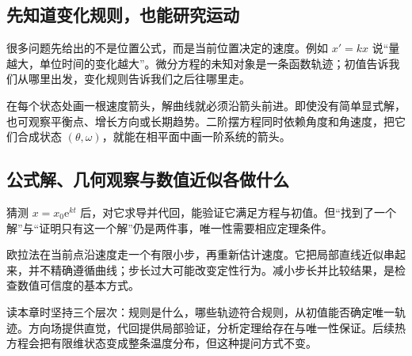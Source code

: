 \subsection*{先知道变化规则，也能研究运动}
很多问题先给出的不是位置公式，而是当前位置决定的速度。例如 $x'=kx$ 说“量越大，单位时间的变化越大”。微分方程的未知对象是一条函数轨迹；初值告诉我们从哪里出发，变化规则告诉我们之后往哪里走。

在每个状态处画一根速度箭头，解曲线就必须沿箭头前进。即使没有简单显式解，也可观察平衡点、增长方向或长期趋势。二阶摆方程同时依赖角度和角速度，把它们合成状态 $(\theta,\omega)$，就能在相平面中画一阶系统的箭头。

\subsection*{公式解、几何观察与数值近似各做什么}
猜测 $x=x_0\mathrm e^{kt}$ 后，对它求导并代回，能验证它满足方程与初值。但“找到了一个解”与“证明只有这一个解”仍是两件事，唯一性需要相应定理条件。

欧拉法在当前点沿速度走一个有限小步，再重新估计速度。它把局部直线近似串起来，并不精确遵循曲线；步长过大可能改变定性行为。减小步长并比较结果，是检查数值可信度的基本方式。

读本章时坚持三个层次：规则是什么，哪些轨迹符合规则，从初值能否确定唯一轨迹。方向场提供直觉，代回提供局部验证，分析定理给存在与唯一性保证。后续热方程会把有限维状态变成整条温度分布，但这种提问方式不变。
